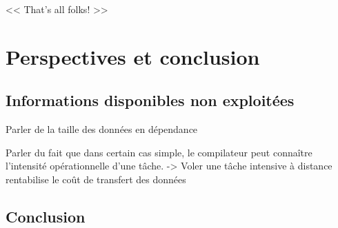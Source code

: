 \begin{savequote}[6cm]
<< That's all folks! >>
\end{savequote}

\chapter{Perspectives et conclusion}\label{chap:conclusion}

\section{Informations disponibles non exploitées}


Parler de la taille des données en dépendance

Parler du fait que dans certain cas simple, le compilateur peut connaître l'intensité opérationnelle d'une tâche.
-> Voler une tâche intensive à distance rentabilise le coût de transfert des données

%


\section{Conclusion}
